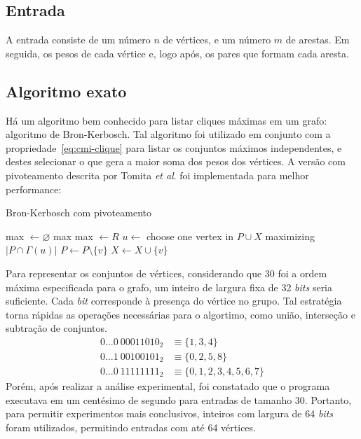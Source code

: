 \documentclass{article}
\begin{document}
\subsection{Entrada}
A entrada consiste de um número $n$ de vértices, e um número $m$ de arestas. Em seguida, os pesos de cada vértice e, logo após, os pares que formam cada aresta.

\subsection{Algoritmo exato}
Há um algoritmo bem conhecido para listar cliques máximas em um grafo: algoritmo de Bron-Kerbosch.\cite{Bron:1973:AFC:362342.362367} Tal algoritmo foi utilizado em conjunto com a propriedade~\eqref{eq:cmi-clique} para listar os conjuntos máximos \mbox{independentes}, e destes selecionar o que gera a maior soma dos pesos dos vértices. A versão com pivoteamento descrita por Tomita \textit{et al}.\cite{TOMITA200628} foi implementada para melhor performance:
\begin{algorithm}
  \caption{Bron-Kerbosch com pivoteamento}
  \begin{algorithmic}[1]
      \State max $\gets \varnothing$
      \State{} 
      \State\Return max
    \EndProcedure
    \vspace{5pt}
       
          \State max $\gets R$
        \EndIf
      \EndIf
      \vspace{3pt}
      \State $u \gets$ choose one vertex in $P \cup X$ maximizing $|P \cap \Gamma(u)|$ 
        \State{}
        \State $P \gets P \setminus \{v\}$
        \State $X \gets X \cup \{v\}$
      \EndFor
    \EndProcedure
  \end{algorithmic}
\end{algorithm}

Para representar os conjuntos de vértices, considerando que $30$ foi a ordem máxima especificada para o grafo, um inteiro de largura fixa de 32 \textit{bits} seria suficiente. Cada \textit{bit} corresponde à presença do vértice no grupo. Tal estratégia torna rápidas as operações necessárias para o algortimo, como união, interseção e subtração de conjuntos.
\begin{align*}
  0 \hdots 0 \> 00011010_2 &\equiv \{1, 3, 4\} \\
  0 \hdots 1 \> 00100101_2 &\equiv \{0, 2, 5, 8\} \\
  0 \hdots 0 \> 11111111_2 &\equiv \{0, 1, 2, 3, 4, 5, 6, 7\}
\end{align*}
Porém, após realizar a análise experimental, foi constatado que o programa executava em um centésimo de segundo para entradas de tamanho $30$. Portanto, para permitir experimentos mais conclusivos, inteiros com largura de 64 \textit{bits} foram utilizados, permitindo entradas com até 64 vértices.
\end{document}
